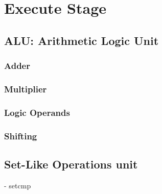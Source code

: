 \chapter{Execute Stage}

\section{ALU: Arithmetic Logic Unit}
\subsection{Adder}
\subsection{Multiplier}
\subsection{Logic Operands}
\subsection{Shifting}

\section{Set-Like Operations unit}
- setcmp